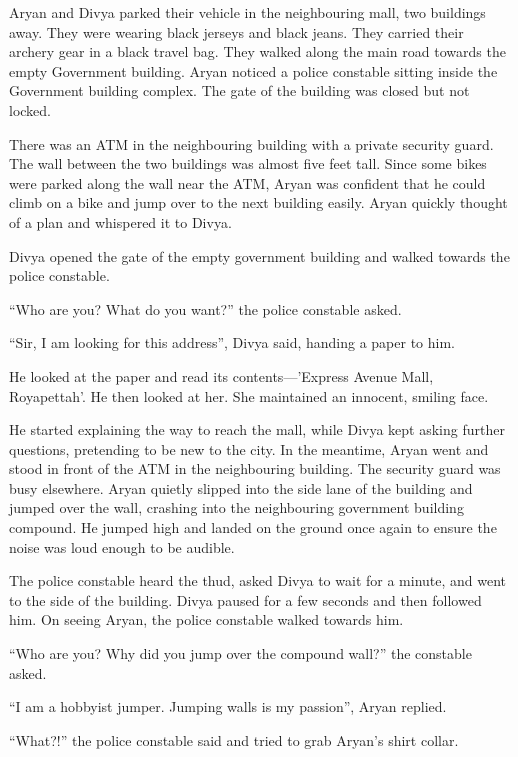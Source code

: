 Aryan and Divya parked their vehicle in the neighbouring mall, two buildings
away. They were wearing black jerseys and black jeans. They carried their
archery gear in a black travel bag. They walked along the main road towards the
empty Government building. Aryan noticed a police constable sitting inside the
Government building complex. The gate of the building was closed but not locked.

There was an ATM in the neighbouring building with a private security guard. The
wall between the two buildings was almost five feet tall. Since some bikes were
parked along the wall near the ATM, Aryan was confident that he could climb on a
bike and jump over to the next building easily. Aryan quickly thought of a plan
and whispered it to Divya.

Divya opened the gate of the empty government building and walked towards the
police constable.

“Who are you? What do you want?” the police constable asked.

“Sir, I am looking for this address”, Divya said, handing a paper to him.

He looked at the paper and read its contents—'Express Avenue Mall,
Royapettah'. He then looked at her. She maintained an innocent, smiling face.

He started explaining the way to reach the mall, while Divya kept asking further
questions, pretending to be new to the city. In the meantime, Aryan went and
stood in front of the ATM in the neighbouring building. The security guard was
busy elsewhere. Aryan quietly slipped into the side lane of the building and
jumped over the wall, crashing into the neighbouring government building compound.
He jumped high and landed on the ground once again to ensure the noise was
loud enough to be audible.

The police constable heard the thud, asked Divya to wait for a minute, and went
to the side of the building. Divya paused for a few seconds and then followed
him. On seeing Aryan, the police constable walked towards him.

“Who are you? Why did you jump over the compound wall?” the constable asked.

“I am a hobbyist jumper. Jumping walls is my passion”, Aryan replied.

“What?!” the police constable said and tried to grab Aryan's shirt collar.

